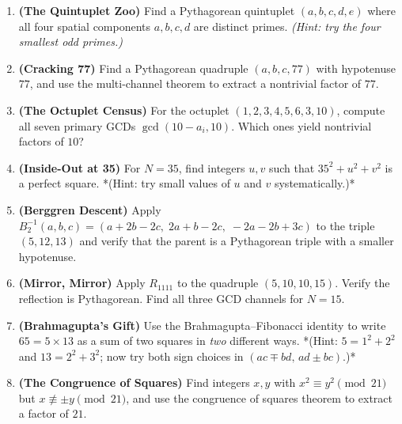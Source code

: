 \begin{enumerate}
\item \textbf{(The Quintuplet Zoo)} Find a Pythagorean quintuplet $(a, b, c, d, e)$ where all four spatial components $a, b, c, d$ are distinct primes. \textit{(Hint: try the four smallest odd primes.)}
\item \textbf{(Cracking 77)} Find a Pythagorean quadruple $(a, b, c, 77)$ with hypotenuse $77$, and use the multi-channel theorem to extract a nontrivial factor of $77$.
\item \textbf{(The Octuplet Census)} For the octuplet $(1, 2, 3, 4, 5, 6, 3, 10)$, compute all seven primary GCDs $\gcd(10 - a_i, 10)$. Which ones yield nontrivial factors of $10$?
\item \textbf{(Inside-Out at 35)} For $N = 35$, find integers $u, v$ such that $35^2 + u^2 + v^2$ is a perfect square. *(Hint: try small values of $u$ and $v$ systematically.)*
\item \textbf{(Berggren Descent)} Apply $B_2^{-1}(a, b, c) = (a + 2b - 2c,\; 2a + b - 2c,\; -2a - 2b + 3c)$ to the triple $(5, 12, 13)$ and verify that the parent is a Pythagorean triple with a smaller hypotenuse.
\item \textbf{(Mirror, Mirror)} Apply $R_{1111}$ to the quadruple $(5, 10, 10, 15)$. Verify the reflection is Pythagorean. Find all three GCD channels for $N = 15$.
\item \textbf{(Brahmagupta's Gift)} Use the Brahmagupta--Fibonacci identity to write $65 = 5 \times 13$ as a sum of two squares in \textit{two} different ways. *(Hint: $5 = 1^2 + 2^2$ and $13 = 2^2 + 3^2$; now try both sign choices in $(ac \mp bd, \, ad \pm bc)$.)*
\item \textbf{(The Congruence of Squares)} Find integers $x, y$ with $x^2 \equiv y^2 \pmod{21}$ but $x \not\equiv \pm y \pmod{21}$, and use the congruence of squares theorem to extract a factor of $21$.
\end{enumerate}
